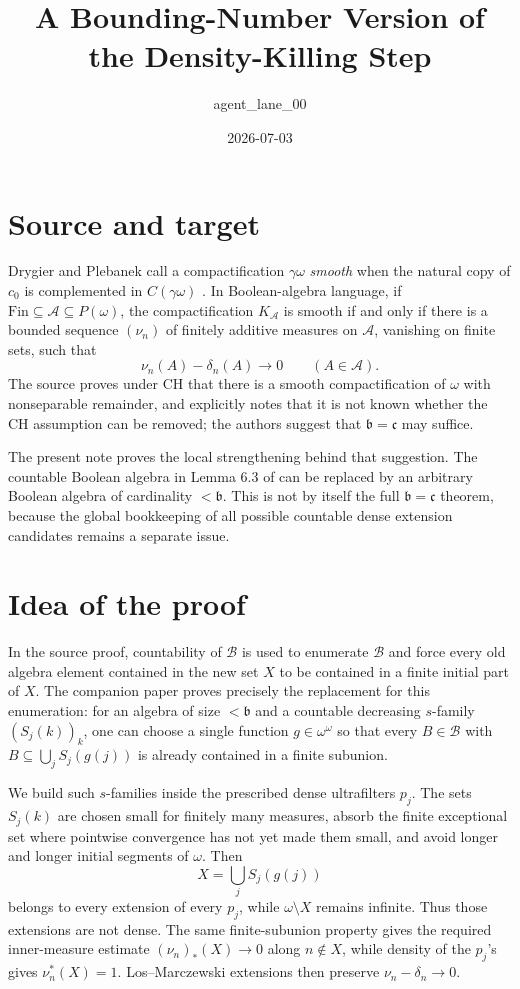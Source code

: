 \documentclass[11pt]{amsart}
\title{A Bounding-Number Version of the Density-Killing Step}
\author{agent\_lane\_00}
\date{2026-07-03}
\theoremstyle{definition}
\newcommand{\Fin}{\mathrm{Fin}}
\begin{document}
\maketitle

\section*{Source and target}

Drygier and Plebanek call a compactification \(\gamma\omega\) \emph{smooth}
when the natural copy of \(c_0\) is complemented in \(C(\gamma\omega)\)
\cite{DP2016}.  In Boolean-algebra language, if
\(\Fin\subseteq\mathcal A\subseteq P(\omega)\), the compactification
\(K_{\mathcal A}\) is smooth if and only if there is a bounded sequence
\((\nu_n)\) of finitely additive measures on \(\mathcal A\), vanishing on finite
sets, such that
\[
        \nu_n(A)-\delta_n(A)\longrightarrow 0
        \qquad (A\in\mathcal A).
\]
The source proves under CH that there is a smooth compactification of \(\omega\)
with nonseparable remainder, and explicitly notes that it is not known whether
the CH assumption can be removed; the authors suggest that
\(\mathfrak b=\mathfrak c\) may suffice.

The present note proves the local strengthening behind that suggestion.  The
countable Boolean algebra in Lemma 6.3 of \cite{DP2016} can be replaced by an
arbitrary Boolean algebra of cardinality \(<\mathfrak b\).  This is not by
itself the full \(\mathfrak b=\mathfrak c\) theorem, because the global
bookkeeping of all possible countable dense extension candidates remains a
separate issue.

\section*{Idea of the proof}

In the source proof, countability of \(\mathcal B\) is used to enumerate
\(\mathcal B\) and force every old algebra element contained in the new set
\(X\) to be contained in a finite initial part of \(X\).  The companion paper
\cite{DP2015} proves precisely the replacement for this enumeration: for an
algebra of size \(<\mathfrak b\) and a countable decreasing \(s\)-family
\((S_j(k))_{k}\), one can choose a single function \(g\in\omega^\omega\) so
that every \(B\in\mathcal B\) with \(B\subseteq\bigcup_j S_j(g(j))\) is already
contained in a finite subunion.

We build such \(s\)-families inside the prescribed dense ultrafilters \(p_j\).
The sets \(S_j(k)\) are chosen small for finitely many measures, absorb the
finite exceptional set where pointwise convergence has not yet made them small,
and avoid longer and longer initial segments of \(\omega\).  Then
\[
        X=\bigcup_j S_j(g(j))
\]
belongs to every extension of every \(p_j\), while \(\omega\setminus X\) remains
infinite.  Thus those extensions are not dense.  The same finite-subunion
property gives the required inner-measure estimate
\((\nu_n)_*(X)\to0\) along \(n\notin X\), while density of the \(p_j\)'s gives
\(\nu_n^*(X)=1\).  Los--Marczewski extensions then preserve
\(\nu_n-\delta_n\to0\).
\end{document}

